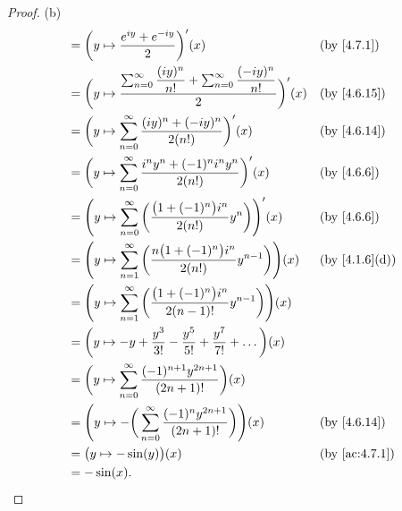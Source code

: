 \begin{proof}{(b)}
\begin{align*}
     & = \bigg(y \mapsto \dfrac{e^{i y} + e^{- i y}}{2}\bigg)'(x)                                                                 &  & \text{(by \cref{4.7.1})}    \\
     & = \bigg(y \mapsto \dfrac{\sum_{n = 0}^\infty \dfrac{(i y)^n}{n!} + \sum_{n = 0}^\infty \dfrac{(- i y)^n}{n!}}{2}\bigg)'(x) &  & \text{(by \cref{4.6.15})}   \\
     & = \bigg(y \mapsto \sum_{n = 0}^\infty \dfrac{(i y)^n + (- i y)^n}{2 (n!)}\bigg)'(x)                                        &  & \text{(by \cref{4.6.14})}   \\
     & = \bigg(y \mapsto \sum_{n = 0}^\infty \dfrac{i^n y^n + (-1)^n i^n y^n}{2 (n!)}\bigg)'(x)                                   &  & \text{(by \cref{4.6.6})}    \\
     & = \Bigg(y \mapsto \sum_{n = 0}^\infty \bigg(\dfrac{\big(1 + (-1)^n\big) i^n}{2 (n!)} y^n\bigg)\Bigg)'(x)                   &  & \text{(by \cref{4.6.6})}    \\
     & = \Bigg(y \mapsto \sum_{n = 1}^\infty \bigg(\dfrac{n \big(1 + (-1)^n\big) i^n}{2 (n!)} y^{n - 1}\bigg)\Bigg)(x)            &  & \text{(by \cref{4.1.6}(d))} \\
     & = \Bigg(y \mapsto \sum_{n = 1}^\infty \bigg(\dfrac{\big(1 + (-1)^n\big) i^n}{2 (n - 1)!} y^{n - 1}\bigg)\Bigg)(x)                                           \\
     & = \bigg(y \mapsto -y + \dfrac{y^3}{3!} - \dfrac{y^5}{5!} + \dfrac{y^7}{7!} + \dots\bigg)(x)                                                                 \\
     & = \bigg(y \mapsto \sum_{n = 0}^\infty \dfrac{(-1)^{n + 1} y^{2n + 1}}{(2n + 1)!}\bigg)(x)                                                                   \\
     & = \Bigg(y \mapsto -\bigg(\sum_{n = 0}^\infty \dfrac{(-1)^n y^{2n + 1}}{(2n + 1)!}\bigg)\Bigg)(x)                           &  & \text{(by \cref{4.6.14})}   \\
     & = \big(y \mapsto -\sin(y)\big)(x)                                                                                          &  & \text{(by \cref{ac:4.7.1})} \\
     & = -\sin(x).
  \end{align*}
\end{proof}

